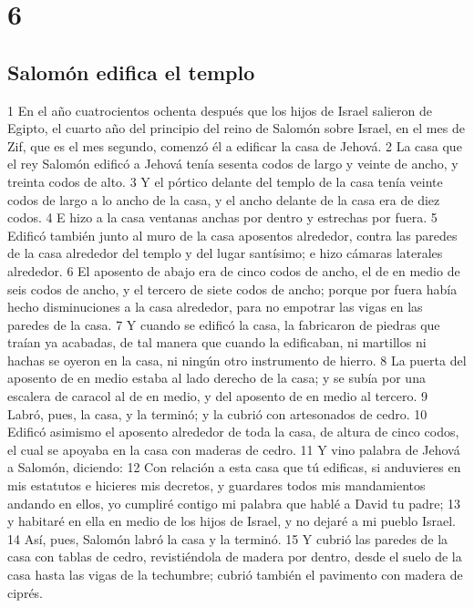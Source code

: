 \chapter{6}

\section*{Salomón edifica el templo}

 

1 En el año cuatrocientos ochenta después que los hijos de Israel salieron de Egipto, el cuarto año del principio del reino de Salomón sobre Israel, en el mes de Zif, que es el mes segundo, comenzó él a edificar la casa de Jehová.
2 La casa que el rey Salomón edificó a Jehová tenía sesenta codos   de largo y veinte de ancho, y treinta codos de alto.
3 Y el pórtico delante del templo de la casa tenía veinte codos   de largo a lo ancho de la casa, y el ancho delante de la casa era de diez codos.
4 E hizo a la casa ventanas anchas por dentro y estrechas por fuera.
5 Edificó también junto al muro de la casa aposentos alrededor, contra las paredes de la casa alrededor del templo y del lugar santísimo; e hizo cámaras laterales alrededor.
6 El aposento de abajo era de cinco codos   de ancho, el de en medio de seis codos de ancho, y el tercero de siete codos de ancho; porque por fuera había hecho disminuciones a la casa alrededor, para no empotrar las vigas en las paredes de la casa.
7 Y cuando se edificó la casa, la fabricaron de piedras que traían ya acabadas, de tal manera que cuando la edificaban, ni martillos ni hachas se oyeron en la casa, ni ningún otro instrumento de hierro.
8 La puerta del aposento de en medio estaba al lado derecho de la casa; y se subía por una escalera de caracol al de en medio, y del aposento de en medio al tercero.
9 Labró, pues, la casa, y la terminó; y la cubrió con artesonados de cedro.
10 Edificó asimismo el aposento alrededor de toda la casa, de altura de cinco codos,  el cual se apoyaba en la casa con maderas de cedro.
11 Y vino palabra de Jehová a Salomón, diciendo:
12 Con relación a esta casa que tú edificas, si anduvieres en mis estatutos e hicieres mis decretos, y guardares todos mis mandamientos andando en ellos, yo cumpliré contigo mi palabra que hablé a David tu padre;
13 y habitaré en ella en medio de los hijos de Israel, y no dejaré a mi pueblo Israel.
14 Así, pues, Salomón labró la casa y la terminó.
15 Y cubrió las paredes de la casa con tablas de cedro, revistiéndola de madera por dentro, desde el suelo de la casa hasta las vigas de la techumbre; cubrió también el pavimento con madera de ciprés.
